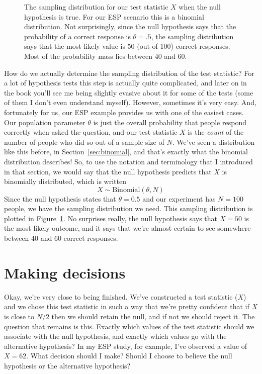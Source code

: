 \begin{figure}[t]
\begin{center}
\caption{The sampling distribution for our test statistic $X$ when the null hypothesis is true. For our ESP scenario this is a binomial distribution. Not surprisingly, since the null hypothesis says that the probability of a correct response is $\theta = .5$, the sampling distribution says that the most likely value is 50 (out of 100) correct responses. Most of the probability mass lies between 40 and 60.}
\HR
\label{fig:samplingdist}
\end{center}
\end{figure}

How do we actually determine the sampling distribution of the test statistic? For a lot of hypothesis tests this step is actually quite complicated, and later on in the book you'll see me being slightly evasive about it for some of the tests (some of them I don't even understand myself). However, sometimes it's very easy. And, fortunately for us, our ESP example provides us with one of the easiest cases. Our population parameter $\theta$ is just the overall probability that people respond correctly when asked the question, and our test statistic $X$ is the {\it count} of the number of people who did so out of a sample size of $N$. We've seen a distribution like this before, in Section~\ref{sec:binomial}, and that's exactly what the binomial distribution describes! So, to use the notation and terminology that I introduced in that section, we would say that the null hypothesis predicts that $X$ is binomially distributed, which is written
$$
X \sim \mbox{Binomial}(\theta,N)
$$
Since the null hypothesis states that $\theta = 0.5$ and our experiment has $N=100$ people, we have the sampling distribution we need. This sampling distribution is plotted in Figure~\ref{fig:samplingdist}. No surprises really, the null hypothesis says that $X=50$ is the most likely outcome, and it says that we're almost certain to see somewhere between 40 and 60 correct responses. 


\section{Making decisions~\label{sec:decisionmaking}}

Okay, we're very close to being finished. We've constructed a test statistic ($X$) and we chose this test statistic in such a way that we're pretty confident that if $X$ is close to $N/2$ then we should retain the null, and  if not we should reject it. The question that remains is this. Exactly which values of the test statistic should we associate with the null hypothesis, and exactly which values go with the alternative hypothesis? In my ESP study, for example, I've observed a value of $X=62$. What decision should I make? Should I choose to believe the null hypothesis or the alternative hypothesis?

